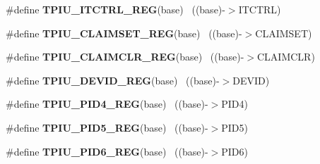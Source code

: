 \begin{DoxyCompactItemize}
\item 
\hypertarget{group___t_p_i_u___register___accessor___macros_ga3fb80a5db7419d9b28f36030fa56c9f6}{}\#define {\bfseries T\+P\+I\+U\+\_\+\+I\+T\+C\+T\+R\+L\+\_\+\+R\+E\+G}(base)                                    ~((base)-\/$>$I\+T\+C\+T\+R\+L)\label{group___t_p_i_u___register___accessor___macros_ga3fb80a5db7419d9b28f36030fa56c9f6}

\item 
\hypertarget{group___t_p_i_u___register___accessor___macros_ga36e2ff51a935b49ba3848abac32d9771}{}\#define {\bfseries T\+P\+I\+U\+\_\+\+C\+L\+A\+I\+M\+S\+E\+T\+\_\+\+R\+E\+G}(base)                                ~((base)-\/$>$C\+L\+A\+I\+M\+S\+E\+T)\label{group___t_p_i_u___register___accessor___macros_ga36e2ff51a935b49ba3848abac32d9771}

\item 
\hypertarget{group___t_p_i_u___register___accessor___macros_ga0e17510140274c78c7590de1b5d39c75}{}\#define {\bfseries T\+P\+I\+U\+\_\+\+C\+L\+A\+I\+M\+C\+L\+R\+\_\+\+R\+E\+G}(base)                                ~((base)-\/$>$C\+L\+A\+I\+M\+C\+L\+R)\label{group___t_p_i_u___register___accessor___macros_ga0e17510140274c78c7590de1b5d39c75}

\item 
\hypertarget{group___t_p_i_u___register___accessor___macros_ga30d4f93f5e89c158bb79417caf4daa37}{}\#define {\bfseries T\+P\+I\+U\+\_\+\+D\+E\+V\+I\+D\+\_\+\+R\+E\+G}(base)                                      ~((base)-\/$>$D\+E\+V\+I\+D)\label{group___t_p_i_u___register___accessor___macros_ga30d4f93f5e89c158bb79417caf4daa37}

\item 
\hypertarget{group___t_p_i_u___register___accessor___macros_ga2fb69dcf92ae17576611bbaef82a311b}{}\#define {\bfseries T\+P\+I\+U\+\_\+\+P\+I\+D4\+\_\+\+R\+E\+G}(base)                                        ~((base)-\/$>$P\+I\+D4)\label{group___t_p_i_u___register___accessor___macros_ga2fb69dcf92ae17576611bbaef82a311b}

\item 
\hypertarget{group___t_p_i_u___register___accessor___macros_ga23bae8088e08814bfd85ca65917ef08d}{}\#define {\bfseries T\+P\+I\+U\+\_\+\+P\+I\+D5\+\_\+\+R\+E\+G}(base)                                        ~((base)-\/$>$P\+I\+D5)\label{group___t_p_i_u___register___accessor___macros_ga23bae8088e08814bfd85ca65917ef08d}

\item 
\hypertarget{group___t_p_i_u___register___accessor___macros_ga135cc7558ac7d8d2cce7535a7f2b2a0e}{}\#define {\bfseries T\+P\+I\+U\+\_\+\+P\+I\+D6\+\_\+\+R\+E\+G}(base)                                        ~((base)-\/$>$P\+I\+D6)\label{group___t_p_i_u___register___accessor___macros_ga135cc7558ac7d8d2cce7535a7f2b2a0e}


\end{DoxyCompactItemize}
